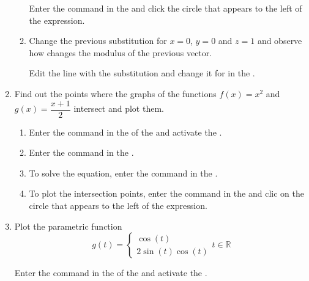 \begin{enumerate}
\begin{enumerate}
\begin{indication}
            Enter the command \command{|\$|} in the  and click the circle that appears to the left of the expression.
            \end{indication}
      \item Change the previous substitution for $x=0$, $y=0$ and $z=1$ and observe how changes the modulus of the previous vector.
            \begin{indication}
            Edit the line with the substitution and change it for  in the .
            \end{indication}
      \end{enumerate}

\item Find out the points where the graphs of the functions $f(x)=x^2$ and $g(x)=\dfrac{x+1}{2}$ intersect and plot them.
      \begin{enumerate}
      \item Enter the command  in the  of the  and activate the .
      \item Enter the command  in the .
      \item To solve the equation, enter the command  in the .
      \item To plot the intersection points, enter the command  in the  and clic on the circle that appears to the left of the expression.
      \end{enumerate}

\item Plot the parametric function
      \[
      g(t)=
      \begin{cases}
      \cos(t) \\
      2\sin(t)\cos(t)
      \end{cases}
      t\in \mathbb{R}
      \]

      \begin{indication}
      Enter the command  in the  of the  and activate the .
      \end{indication}


\end{enumerate}
